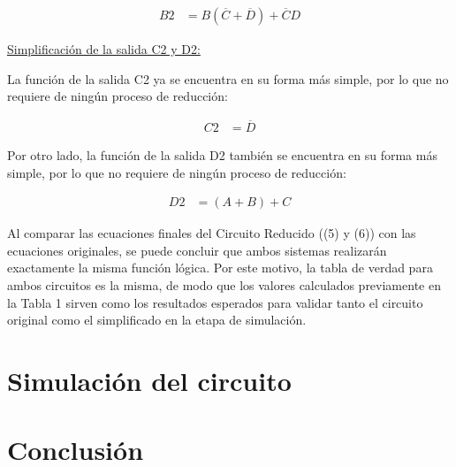 \documentclass[12pt,letterpaper]{article}
\newcommand{\boolnot}[1]{\ensuremath{\overline{#1}}}
\begin{document}
    \begin{align*}
        B2 &= B(\boolnot{C} + \boolnot{D}) + \boolnot{C}D
    \end{align*}

    \underline{Simplificación de la salida C2 y D2:}

    La función de la salida C2 ya se encuentra en su forma más simple, por lo que no requiere de ningún proceso de reducción:
    
    \begin{align*}
        C2 &= \boolnot{D}
    \end{align*}

    Por otro lado, la función de la salida D2 también se encuentra en su forma más simple, por lo que no requiere de ningún proceso de reducción:  

    \begin{align*}
        D2 &= (A + B) + C
    \end{align*}

    Al comparar las ecuaciones finales del Circuito Reducido ((5) y (6)) con las ecuaciones originales, se puede concluir que ambos sistemas realizarán exactamente la misma función lógica. Por este motivo, la tabla de verdad para ambos circuitos es la misma, de modo que los valores calculados previamente en la Tabla 1 sirven como los resultados esperados para validar tanto el circuito original como el simplificado en la etapa de simulación.

    \newpage
    \section{Simulación del circuito}

    

    \newpage
    \section{Conclusión}
\end{document}
